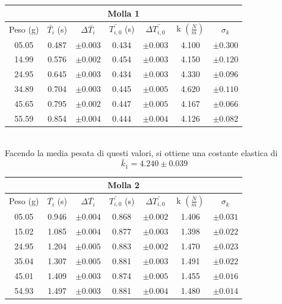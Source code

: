 \documentclass[a4paper]{article}
\begin{document}
{
\begin{table}[!ht]
    \centering
\begin{tabular}{|c|c|c|c|c|c|c|}
    \hline
    \multicolumn{7}{|c|}{Molla 1} \\
    \hline
    Peso (g) & $\bar{T_i}$ (s) & $\Delta \bar{T_i}$ & $\bar{T_{i,0}}$ (s) & $\Delta \bar{T_{i,0}}$ & k $(\frac{N}{m})$ & $\sigma_k$ \\
    \hline 
    05.05 & 0.487 & $\pm{0.003}$ & 0.434 & $\pm{0.003}$ & 4.100 & $\pm{0.300}$ \\
    14.99 & 0.576 & $\pm{0.002}$ & 0.454 & $\pm{0.003}$ & 4.150 & $\pm{0.120}$ \\
    24.95 & 0.645 & $\pm{0.003}$ & 0.434 & $\pm{0.003}$ & 4.330 & $\pm{0.096}$ \\
    34.89 & 0.704 & $\pm{0.003}$ & 0.445 & $\pm{0.005}$ & 4.620 & $\pm{0.110}$ \\
    45.65 & 0.795 & $\pm{0.002}$ & 0.447 & $\pm{0.005}$ & 4.167 & $\pm{0.066}$ \\
    55.59 & 0.854 & $\pm{0.004}$ & 0.444 & $\pm{0.004}$ & 4.126 & $\pm{0.082}$ \\
    \hline
\end{tabular}
\end{table}
\\
Facendo la media pesata di questi valori, si ottiene una costante elastica di 
\begin{equation}
    \bar{k}_1 = 4.240\pm{0.039}
\end{equation}

\begin{table}[!ht]
    \centering
\begin{tabular}{|c|c|c|c|c|c|c|}
    \hline
    \multicolumn{7}{|c|}{Molla 2} \\
    \hline
    Peso (g) & $\bar{T_i}$ (s) & $\Delta \bar{T_i}$ & $\bar{T_{i,0}}$ (s) & $\Delta \bar{T_{i,0}}$ & k $(\frac{N}{m})$ & $\sigma_k$ \\
    \hline
    05.05 & 0.946 & $\pm{0.004}$ & 0.868 & $\pm{0.002}$ & 1.406 & $\pm{0.031}$ \\
    15.02 & 1.085 & $\pm{0.004}$ & 0.877 & $\pm{0.003}$ & 1.398 & $\pm{0.022}$ \\
    24.95 & 1.204 & $\pm{0.005}$ & 0.883 & $\pm{0.002}$ & 1.470 & $\pm{0.023}$ \\
    35.04 & 1.307 & $\pm{0.005}$ & 0.881 & $\pm{0.003}$ & 1.491 & $\pm{0.022}$ \\
    45.01 & 1.409 & $\pm{0.003}$ & 0.874 & $\pm{0.005}$ & 1.455 & $\pm{0.016}$ \\
    54.93 & 1.497 & $\pm{0.003}$ & 0.881 & $\pm{0.004}$ & 1.480 & $\pm{0.014}$ \\
    \hline
\end{tabular}
\end{table}

}
\end{document}

